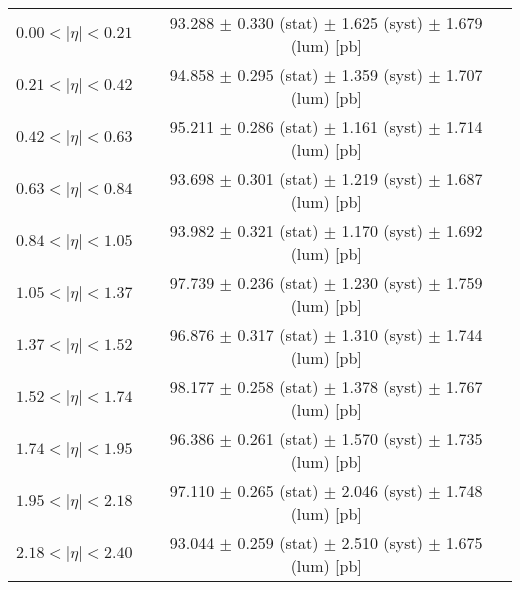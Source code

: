 \begin{tabular}{lc}
\hline
$0.00 < |\eta| <0.21$          & 93.288 $\pm$ 0.330 (stat) $\pm$ 1.625 (syst) $\pm$ 1.679 (lum) [pb]  \\
$0.21 < |\eta| <0.42$          & 94.858 $\pm$ 0.295 (stat) $\pm$ 1.359 (syst) $\pm$ 1.707 (lum) [pb]  \\
$0.42 < |\eta| <0.63$          & 95.211 $\pm$ 0.286 (stat) $\pm$ 1.161 (syst) $\pm$ 1.714 (lum) [pb]  \\
$0.63 < |\eta| <0.84$          & 93.698 $\pm$ 0.301 (stat) $\pm$ 1.219 (syst) $\pm$ 1.687 (lum) [pb]  \\
$0.84 < |\eta| <1.05$          & 93.982 $\pm$ 0.321 (stat) $\pm$ 1.170 (syst) $\pm$ 1.692 (lum) [pb]  \\
$1.05 < |\eta| <1.37$          & 97.739 $\pm$ 0.236 (stat) $\pm$ 1.230 (syst) $\pm$ 1.759 (lum) [pb]  \\
$1.37 < |\eta| <1.52$          & 96.876 $\pm$ 0.317 (stat) $\pm$ 1.310 (syst) $\pm$ 1.744 (lum) [pb]  \\
$1.52 < |\eta| <1.74$          & 98.177 $\pm$ 0.258 (stat) $\pm$ 1.378 (syst) $\pm$ 1.767 (lum) [pb]  \\
$1.74 < |\eta| <1.95$          & 96.386 $\pm$ 0.261 (stat) $\pm$ 1.570 (syst) $\pm$ 1.735 (lum) [pb]  \\
$1.95 < |\eta| <2.18$          & 97.110 $\pm$ 0.265 (stat) $\pm$ 2.046 (syst) $\pm$ 1.748 (lum) [pb]  \\
$2.18 < |\eta| <2.40$          & 93.044 $\pm$ 0.259 (stat) $\pm$ 2.510 (syst) $\pm$ 1.675 (lum) [pb]  \\
\hline
\end{tabular}
